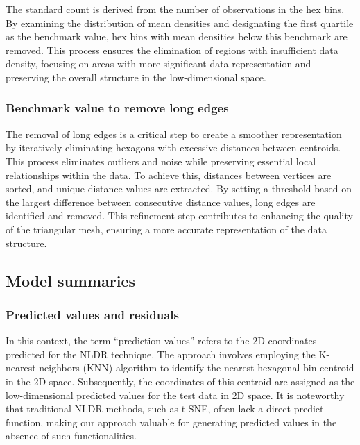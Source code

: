 \documentclass[
  12pt]{article}
\begin{document}
The standard count is derived from the number of observations in the hex
bins. By examining the distribution of mean densities and designating
the first quartile as the benchmark value, hex bins with mean densities
below this benchmark are removed. This process ensures the elimination
of regions with insufficient data density, focusing on areas with more
significant data representation and preserving the overall structure in
the low-dimensional space.

\hypertarget{benchmark-value-to-remove-long-edges}{%
\subsubsection{Benchmark value to remove long
edges}\label{benchmark-value-to-remove-long-edges}}

The removal of long edges is a critical step to create a smoother
representation by iteratively eliminating hexagons with excessive
distances between centroids. This process eliminates outliers and noise
while preserving essential local relationships within the data. To
achieve this, distances between vertices are sorted, and unique distance
values are extracted. By setting a threshold based on the largest
difference between consecutive distance values, long edges are
identified and removed. This refinement step contributes to enhancing
the quality of the triangular mesh, ensuring a more accurate
representation of the data structure.

\hypertarget{sec-summary}{%
\subsection{Model summaries}\label{sec-summary}}

\hypertarget{predicted-values-and-residuals}{%
\subsubsection{Predicted values and
residuals}\label{predicted-values-and-residuals}}

In this context, the term ``prediction values'' refers to the 2D
coordinates predicted for the NLDR technique. The approach involves
employing the K-nearest neighbors (KNN) algorithm to identify the
nearest hexagonal bin centroid in the 2D space. Subsequently, the
coordinates of this centroid are assigned as the low-dimensional
predicted values for the test data in 2D space. It is noteworthy that
traditional NLDR methods, such as t-SNE, often lack a direct predict
function, making our approach valuable for generating predicted values
in the absence of such functionalities.
\end{document}
